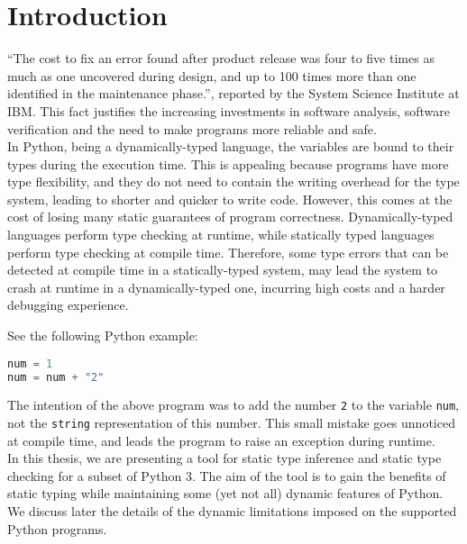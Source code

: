 
\chapter{Introduction}\label{chapter:introduction}

“The cost to fix an error found after product release was four to five times as much as one uncovered during design, and up to 100 times more than one identified in the maintenance phase.”, reported by the System Science Institute at IBM. This fact justifies the increasing investments in software analysis, software verification and the need to make programs more reliable and safe.\\

In Python, being a dynamically-typed language, the variables are bound to their types during the execution time. This is appealing because programs have more type flexibility, and they do not need to contain the writing overhead for the type system, leading to shorter and quicker to write code. However, this comes at the cost of losing many static guarantees of program correctness. Dynamically-typed languages perform type checking at runtime, while statically typed languages perform type checking at compile time. Therefore, some type errors that can be detected at compile time in a statically-typed system, may lead the system to crash at runtime in a dynamically-typed one, incurring high costs and a harder debugging experience.

See the following Python example:

\begin{lstlisting}[language=python]
num = 1
num = num + "2"
\end{lstlisting}



The intention of the above program was to add the number \lstinline|2| to the variable \lstinline|num|, not the \lstinline|string| representation of this number. This small mistake goes unnoticed at compile time, and leads the program to raise an exception during runtime.\\

In this thesis, we are presenting a tool for static type inference and static type checking for a subset of Python 3. The aim of the tool is to gain the benefits of static typing while maintaining some (yet not all) dynamic features of Python. We discuss later the details of the dynamic limitations imposed on the supported Python programs.\\

